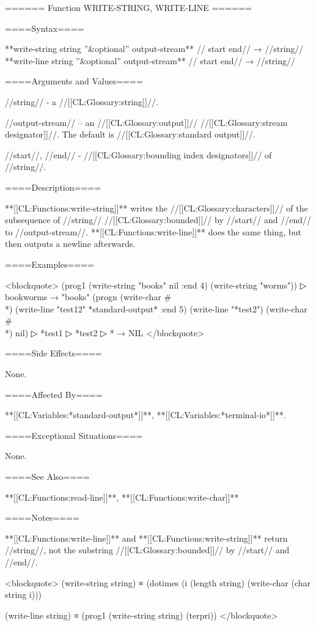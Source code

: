 ====== Function WRITE-STRING, WRITE-LINE ======

====Syntax====

**{write-string} {string ''&optional'' output-stream** //\key} start end// → //string// **{write-line} {string ''&optional'' output-stream** //\key} start end// → //string//

====Arguments and Values====

//string// - a //[[CL:Glossary:string]]//.

//output-stream// -- an //[[CL:Glossary:output]]// //[[CL:Glossary:stream designator]]//. The default is //[[CL:Glossary:standard output]]//.

//start//, //end// - //[[CL:Glossary:bounding index designators]]// of //string//. 

====Description====

**[[CL:Functions:write-string]]** writes the //[[CL:Glossary:characters]]// of the subsequence of //string// //[[CL:Glossary:bounded]]// by //start// and //end// to //output-stream//. **[[CL:Functions:write-line]]** does the same thing, but then outputs a newline afterwards.

====Examples====

<blockquote> (prog1 (write-string "books" nil :end 4) (write-string "worms"))
▷ bookworms → "books" (progn (write-char #\\*) (write-line "test12" *standard-output* :end 5) (write-line "*test2") (write-char #\\*) nil)
▷ *test1
▷ *test2
▷ * → NIL </blockquote>

====Side Effects====

None.

====Affected By====

**[[CL:Variables:*standard-output*]]**, **[[CL:Variables:*terminal-io*]]**.

====Exceptional Situations====

None.

====See Also====

**[[CL:Functions:read-line]]**, **[[CL:Functions:write-char]]**

====Notes====

**[[CL:Functions:write-line]]** and **[[CL:Functions:write-string]]** return //string//, not the substring //[[CL:Glossary:bounded]]// by //start// and //end//.

<blockquote> (write-string string) ≡ (dotimes (i (length string) (write-char (char string i)))

(write-line string) ≡ (prog1 (write-string string) (terpri)) </blockquote>

  
